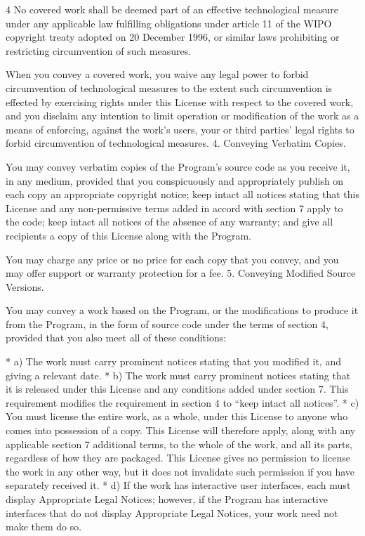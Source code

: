 \documentclass[fontsize=11pt,paper=A4,BCOR=12mm,DIV=13,open=any,listof=totoc,toc=flat]{scrbook}
\begin{document}
{\begin{multicols}{4}
No covered work shall be deemed part of an effective technological measure under any applicable law fulfilling obligations under article 11 of the WIPO copyright treaty adopted on 20 December 1996, or similar laws prohibiting or restricting circumvention of such measures.

When you convey a covered work, you waive any legal power to forbid circumvention of technological measures to the extent such circumvention is effected by exercising rights under this License with respect to the covered work, and you disclaim any intention to limit operation or modification of the work as a means of enforcing, against the work's users, your or third parties' legal rights to forbid circumvention of technological measures.
4. Conveying Verbatim Copies.

You may convey verbatim copies of the Program's source code as you receive it, in any medium, provided that you conspicuously and appropriately publish on each copy an appropriate copyright notice; keep intact all notices stating that this License and any non-permissive terms added in accord with section 7 apply to the code; keep intact all notices of the absence of any warranty; and give all recipients a copy of this License along with the Program.

You may charge any price or no price for each copy that you convey, and you may offer support or warranty protection for a fee.
5. Conveying Modified Source Versions.

You may convey a work based on the Program, or the modifications to produce it from the Program, in the form of source code under the terms of section 4, provided that you also meet all of these conditions:

    * a) The work must carry prominent notices stating that you modified it, and giving a relevant date.
    * b) The work must carry prominent notices stating that it is released under this License and any conditions added under section 7. This requirement modifies the requirement in section 4 to “keep intact all notices”.
    * c) You must license the entire work, as a whole, under this License to anyone who comes into possession of a copy. This License will therefore apply, along with any applicable section 7 additional terms, to the whole of the work, and all its parts, regardless of how they are packaged. This License gives no permission to license the work in any other way, but it does not invalidate such permission if you have separately received it.
    * d) If the work has interactive user interfaces, each must display Appropriate Legal Notices; however, if the Program has interactive interfaces that do not display Appropriate Legal Notices, your work need not make them do so.


\end{multicols}}
\end{document}
